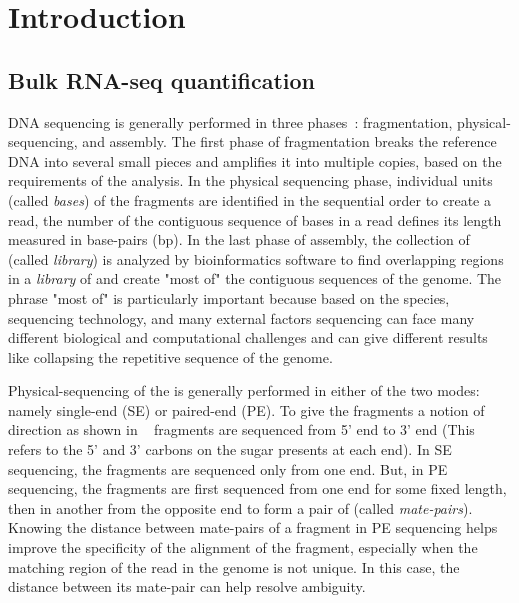 
\chapter{Introduction} %
\label{intro} %


\section{Bulk RNA-seq quantification}
DNA sequencing is generally performed in three phases~\citep{schadt2010window}: fragmentation, physical-sequencing, and assembly. The first phase of fragmentation breaks the reference DNA into several small pieces and amplifies it into multiple copies, based on the requirements of the analysis. In the physical sequencing phase, individual units (called \textit{bases}) of the fragments are identified in the sequential order to create a read, the number of the contiguous sequence of bases in a read defines its length measured in base-pairs (bp). In the last phase of assembly, the collection of \reads (called \textit{library}) is analyzed by bioinformatics software to find overlapping regions in a \textit{library} of \reads and create "most of" the contiguous sequences of the genome. The phrase "most of" is particularly important because based on the species, sequencing technology, and many external factors sequencing can face many different biological and computational challenges and can give different results like collapsing the repetitive sequence of the genome.


\begin{figure*}[!htb]
\centering
\texttt{[image: rapmap/\{Avi.RPE.fig.4]}.pdf}
\caption{From top to bottom: Single-End Sequencing, Paired-End Sequencing, information retained after Paired-End sequencing.}
\label{fig:pe-seq}
\end{figure*}


Physical-sequencing of the \reads is generally performed in either of the two modes: namely single-end (SE) or paired-end (PE). To give the fragments a notion of direction as shown in ~ fragments are sequenced from 5' end to 3' end (This refers to the 5' and 3' carbons on the sugar presents at each end). In SE sequencing, the fragments are sequenced only from one end. But, in PE sequencing, the fragments are first sequenced from one end for some fixed length, then in another from the opposite end to form a pair of \reads (called \textit{mate-pairs}). Knowing the distance between mate-pairs of a fragment in PE sequencing helps improve the specificity of the alignment of the fragment, especially when the matching region of the read in the genome is not unique. In this case, the distance between its mate-pair can help resolve ambiguity.

